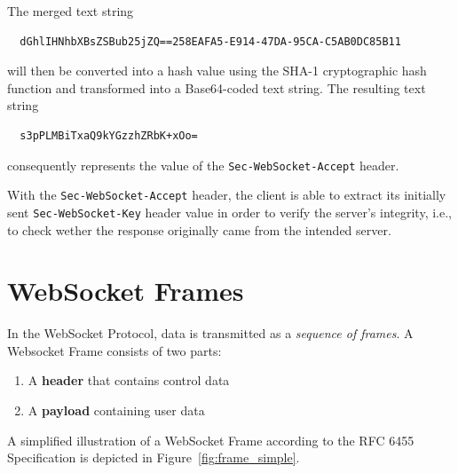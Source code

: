 \documentclass[a4paper, justified, notoc]{tufte-handout} %
\begin{document}
The merged text string 
\begin{Verbatim}
  dGhlIHNhbXBsZSBub25jZQ==258EAFA5-E914-47DA-95CA-C5AB0DC85B11
\end{Verbatim}
will then be converted into a hash value using the SHA-1 cryptographic hash function and transformed into a Base64-coded text string. The resulting text string
\begin{Verbatim}
  s3pPLMBiTxaQ9kYGzzhZRbK+xOo=
\end{Verbatim}
consequently represents the value of the \texttt{Sec-WebSocket-Accept} header.

With the \texttt{Sec-WebSocket-Accept} header, the client is able to extract its initially sent \texttt{Sec-WebSocket-Key} header value in order to verify the server's integrity, i.e., to check wether the response originally came from the intended server.



\section{WebSocket Frames} %
\label{sec:the_dataframe}

In the WebSocket Protocol, data is transmitted as a \emph{sequence of frames}. A Websocket Frame consists of two parts:
\begin{enumerate}
	\item A \textbf{header} that contains control data
	\item A \textbf{payload} containing user data
\end{enumerate}
A simplified illustration of a WebSocket Frame according to the RFC 6455 Specification is depicted in Figure~\ref{fig:frame_simple}.
\end{document}
